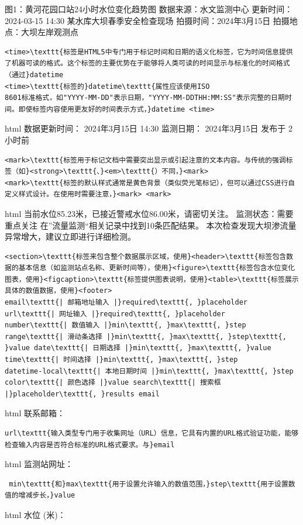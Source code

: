 图1：黄河花园口站24小时水位变化趋势图 数据来源：水文监测中心 \textbar{} 更新时间：2024-03-15 14:30 某水库大坝春季安全检查现场 拍摄时间：2024年3月15日 \textbar{} 拍摄地点：大坝左岸观测点
\begin{lstlisting}
<time>\texttt{标签是HTML5中专门用于标记时间和日期的语义化标签，它为时间信息提供了机器可读的格式。这个标签的主要优势在于能够将人类可读的时间显示与标准化的时间格式（通过}datetime
<time>\texttt{标签的}datetime\texttt{属性应该使用ISO
8601标准格式，如"YYYY-MM-DD"表示日期，"YYYY-MM-DDTHH:MM:SS"表示完整的日期时间。即使标签内容使用更友好的时间表示方式，}datetime <time> \end{lstlisting} html
数据更新时间： 2024年3月15日 14:30 监测日期： 2024年3月15日 发布于 2小时前 \begin{lstlisting}
<mark>\texttt{标签用于标记文档中需要突出显示或引起注意的文本内容。与传统的强调标签（如}<strong>\texttt{、}<em>\texttt{）不同，}<mark>
<mark>\texttt{标签的默认样式通常是黄色背景（类似荧光笔标记），但可以通过CSS进行自定义样式设计。在使用时需要注意，}<mark> <mark> \end{lstlisting} html
当前水位85.23米，已接近警戒水位86.00米，请密切关注。 监测状态：需要重点关注 在''流量监测``相关记录中找到10条匹配结果。 本次检查发现大坝渗流量异常增大，建议立即进行详细检测。 \begin{lstlisting}
<section>\texttt{标签来包含整个数据展示区域，使用}<header>\texttt{标签包含数据的基本信息（如监测站点名称、更新时间等），使用}<figure>\texttt{标签包含水位变化图表，使用}<figcaption>\texttt{标签提供图表说明，使用}<table>\texttt{标签展示具体的数值数据，使用}<footer>
email\texttt{| 邮箱地址输入 |}required\texttt{, }placeholder url\texttt{| 网址输入 |}required\texttt{, }placeholder
number\texttt{| 数值输入 |}min\texttt{, }max\texttt{, }step range\texttt{| 滑动条选择 |}min\texttt{, }max\texttt{, }step\texttt{,
}value date\texttt{| 日期选择 |}min\texttt{, }max\texttt{, }value time\texttt{| 时间选择 |}min\texttt{, }max\texttt{, }step
datetime-local\texttt{| 本地日期时间 |}min\texttt{, }max\texttt{, }step color\texttt{| 颜色选择 |}value search\texttt{| 搜索框
|}placeholder\texttt{, }results email \end{lstlisting} html 联系邮箱： \begin{lstlisting}
url\texttt{输入类型专门用于收集网址（URL）信息，它具有内置的URL格式验证功能，能够检查输入内容是否符合标准的URL格式要求。与}email \end{lstlisting} html 监测站网址：
\begin{lstlisting} min\texttt{和}max\texttt{用于设置允许输入的数值范围，}step\texttt{用于设置数值的增减步长，}value \end{lstlisting} html 水位 (米)：
